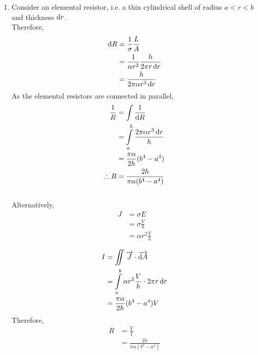 \documentclass[fleqn, a4paper, 12pt, twoside]{article}
\theoremstyle{definition}
\theoremstyle{theorem}
\begin{document}
\begin{solution}
	\begin{enumerate}[leftmargin = *]
		\item
			Consider an elemental resistor, i.e. a thin cylindrical shell of radius $a < r < b$ and thickness $\dif r$.\\
			Therefore,
			\begin{align*}
				\dif R & = \frac{1}{\sigma} \frac{L}{A}                  \\
                                       & = \frac{1}{\alpha r^2} \frac{h}{2 \pi r \dif r} \\
                                       & = \frac{h}{2 \pi \alpha r^3 \dif r}
			\end{align*}
			As the elemental resistors are connected in parallel,
			\begin{align*}
				\frac{1}{R}  & = \int \frac{1}{\dif R}                                 \\
                                             & = \int\limits_{a}^{b} \frac{2 \pi \alpha r^3 \dif r}{h} \\
                                             & = \frac{\pi \alpha}{2 h} (b^4 - a^4)                    \\
				\therefore R & = \frac{2 h}{\pi \alpha (b^4 - a^4)}
			\end{align*}
			~\\
			Alternatively,
			\begin{align*}
				J & = \sigma E               \\
                                  & = \sigma \frac{V}{h}     \\
                                  & = \alpha r^2 \frac{V}{h} \\
			\end{align*}
			\begin{align*}
				I & = \iint \overrightarrow{J} \cdot \overrightarrow{\dif A}          \\
                                  & = \int\limits_{a}^{b} \alpha r^2 \frac{V}{h} \cdot 2 \pi r \dif r \\
                                  & = \frac{\pi \alpha}{2 h}(b^4 - a^4) V
			\end{align*}
			Therefore,
			\begin{align*}
				R & = \frac{V}{I} \\
                                  & = \frac{2 h}{\pi \alpha (b^4 - a^4)}
			\end{align*}
			~\\

\end{enumerate}
\end{solution}
\end{document}
